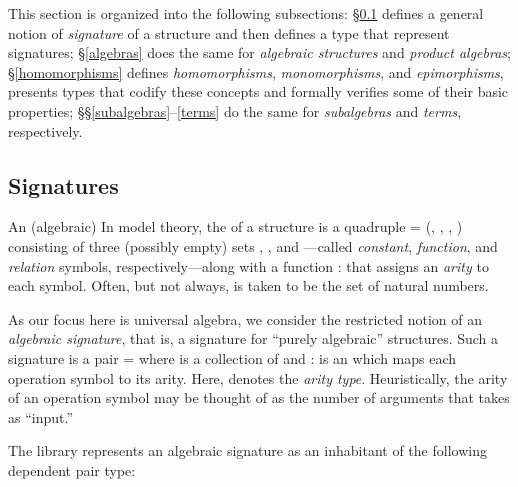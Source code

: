 This section is organized into the following subsections:
§\ref{signatures} defines a general notion of \emph{signature} of a structure and
then defines a type that represent signatures;
§\ref{algebras} does the same for \emph{algebraic structures} and \emph{product algebras};
§\ref{homomorphisms} defines \emph{homomorphisms}, \emph{monomorphisms}, and \emph{epimorphisms},
presents types that codify these concepts and formally verifies some of their basic properties;
§§\ref{subalgebras}--\ref{terms} do the same for \emph{subalgebras} and \emph{terms}, respectively.

\subsection{Signatures}
\label{signatures}

\ifshort
An (algebraic) 
\else
In model theory, the  of a structure is a quadruple  = (,
, , ) consisting of three (possibly empty) sets , , and
---called \emph{constant}, \emph{function}, and \emph{relation} symbols,
respectively---along with a function  :  \as{+}  \as{+} 
  that assigns an \emph{arity} to each symbol. Often, but not always, 
is taken to be the set of natural numbers.

As our focus here is universal algebra, we consider the restricted notion of an
\emph{algebraic signature}, that is, a signature for ``purely algebraic'' structures. Such
a signature
\fi
is a pair  =  where  is a collection of
 and  :    is an 
which maps each operation symbol to its arity. Here,  denotes the \emph{arity type}.
Heuristically, the arity   of an operation symbol    may be
thought of as the number of arguments that  takes as ``input.''

The \agdaalgebras library represents an algebraic signature as an
inhabitant of the following dependent pair type:

